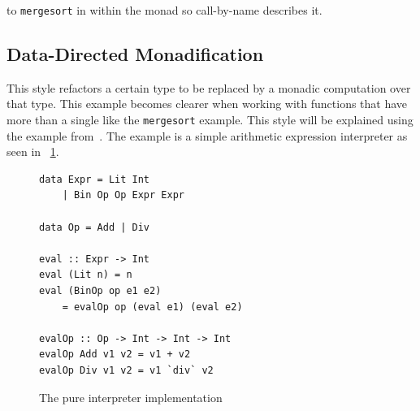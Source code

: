 \DIFdelbegin {}\DIFdelend \DIFaddbegin {}\DIFaddend to \texttt{mergesort} in \DIFdelbegin {}\DIFdelend \DIFaddbegin {}\DIFaddend within the monad so \DIFdelbegin {}\DIFdelend \DIFaddbegin {}\DIFaddend call-by-name \DIFdelbegin {}\DIFdelend \DIFaddbegin {}\DIFaddend describes it. 

\subsection{Data-Directed Monadification}
This style refactors a certain type to be replaced by a monadic computation over that type. This example becomes clearer when working with functions that have more than a single \DIFdelbegin {}\DIFdelend \DIFaddbegin {}\DIFaddend like the \texttt{mergesort} example. This style will be explained using the example from~\DIFdelbegin {}\DIFdelend \DIFaddbegin {}\DIFaddend . The example \DIFdelbegin {}\DIFdelend is a simple arithmetic expression interpreter as seen in \DIFdelbegin {}\DIFdelend \DIFaddbegin {}\DIFaddend ~\ref{fig:interpreter}.

\begin{figure}[t]
\begin{lstlisting}
data Expr = Lit Int
	| Bin Op Op Expr Expr

data Op = Add | Div

eval :: Expr -> Int
eval (Lit n) = n
eval (BinOp op e1 e2)
	= evalOp op (eval e1) (eval e2)

evalOp :: Op -> Int -> Int -> Int
evalOp Add v1 v2 = v1 + v2
evalOp Div v1 v2 = v1 `div` v2
\end{lstlisting}
\caption{The pure interpreter implementation}
\label{fig:interpreter}
\end{figure}

